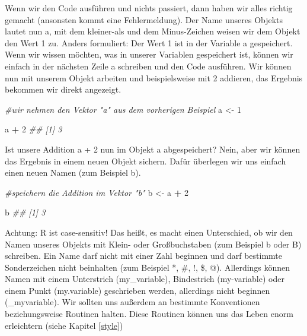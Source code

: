 \documentclass[
]{book}
\newenvironment{Shaded}{\begin{snugshade}}{\end{snugshade}}
\newcommand{\CommentTok}[1]{\textcolor[rgb]{0.56,0.35,0.01}{\textit{#1}}}
\newcommand{\DecValTok}[1]{\textcolor[rgb]{0.00,0.00,0.81}{#1}}
\newcommand{\NormalTok}[1]{#1}
\newcommand{\OperatorTok}[1]{\textcolor[rgb]{0.81,0.36,0.00}{\textbf{#1}}}
\newcommand{\StringTok}[1]{\textcolor[rgb]{0.31,0.60,0.02}{#1}}
\begin{document}
Wenn wir den Code ausführen und nichts passiert, dann haben wir alles richtig gemacht (ansonsten kommt eine Fehlermeldung). Der Name unseres Objekts lautet nun a, mit dem kleiner-als und dem Minus-Zeichen weisen wir dem Objekt den Wert 1 zu. Anders formuliert: Der Wert 1 ist in der Variable a gespeichert. Wenn wir wissen möchten, was in unserer Variablen gespeichert ist, können wir einfach in der nächsten Zeile a schreiben und den Code ausführen. Wir können nun mit unserem Objekt arbeiten und beispielsweise mit 2 addieren, das Ergebnis bekommen wir direkt angezeigt.

\begin{Shaded}
\begin{Highlighting}[]
\CommentTok{#wir nehmen den Vektor "a" aus dem vorherigen Beispiel}
\NormalTok{a <-}\StringTok{ }\DecValTok{1}

\NormalTok{a }\OperatorTok{+}\StringTok{ }\DecValTok{2}
\CommentTok{## [1] 3}
\end{Highlighting}
\end{Shaded}

Ist unsere Addition a + 2 nun im Objekt a abgespeichert? Nein, aber wir können das Ergebnis in einem neuen Objekt sichern. Dafür überlegen wir uns einfach einen neuen Namen (zum Beispiel b).

\begin{Shaded}
\begin{Highlighting}[]
\CommentTok{#speichern die Addition im Vektor "b"}
\NormalTok{b <-}\StringTok{ }\NormalTok{a }\OperatorTok{+}\StringTok{ }\DecValTok{2}

\NormalTok{b}
\CommentTok{## [1] 3}
\end{Highlighting}
\end{Shaded}

Achtung: R ist case-sensitiv! Das heißt, es macht einen Unterschied, ob wir den Namen unseres Objekts mit Klein- oder Großbuchstaben (zum Beispiel b oder B) schreiben. Ein Name darf nicht mit einer Zahl beginnen und darf bestimmte Sonderzeichen nicht beinhalten (zum Beispiel *, \#, !, \$, @). Allerdings können Namen mit einem Unterstrich (my\_variable), Bindestrich (my-variable) oder einem Punkt (my.variable) geschrieben werden, allerdings nicht beginnen (\_myvariable). Wir sollten uns außerdem an bestimmte Konventionen beziehungsweise Routinen halten. Diese Routinen können uns das Leben enorm erleichtern (siehe Kapitel \ref{style})

  
\end{document}

